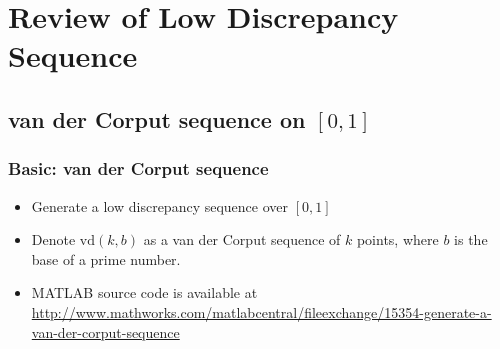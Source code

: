 \documentclass[serif]{beamer} %
\begin{document}
\section{Review of Low Discrepancy Sequence}

\subsection{van der Corput sequence on $[0,1]$}

\begin{frame}[fragile]
\frametitle{Basic: van der Corput sequence}
\begin{itemize}
  \item Generate a low discrepancy sequence over $[0,1]$
  \item Denote $\mathrm{vd}(k,b)$ as a van der Corput sequence of $k$ points, where $b$ is the base of a prime number.
  \item MATLAB source code is available at
  \url{http://www.mathworks.com/matlabcentral/fileexchange/15354-generate-a-van-der-corput-sequence }
\end{itemize}
\begin{example}
  \end{example}
\end{frame}
\end{document}
